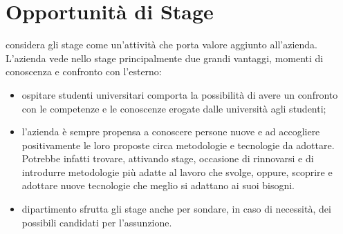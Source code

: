 \section{Opportunità di Stage} 
	\vic{} considera gli stage come un’attività che porta valore aggiunto all’azienda. \\
	L’azienda vede nello stage principalmente due grandi vantaggi,
	momenti di conoscenza e confronto con l’esterno:
	\begin{itemize}
		\item ospitare studenti universitari comporta la possibilità di avere un confronto con
			le competenze e le conoscenze erogate dalle università agli studenti;
		\item l’azienda è sempre propensa a conoscere persone nuove e ad accogliere positivamente
			le loro proposte circa metodologie e tecnologie da adottare. Potrebbe
			infatti trovare, attivando stage, occasione di rinnovarsi e di introdurre metodologie
			più adatte al lavoro che svolge, oppure, scoprire e adottare nuove tecnologie
			che meglio si adattano ai suoi bisogni.
		\item dipartimento sfrutta gli stage anche per sondare, in caso di necessità, dei possibili
		candidati per l’assunzione.
	\end{itemize}
